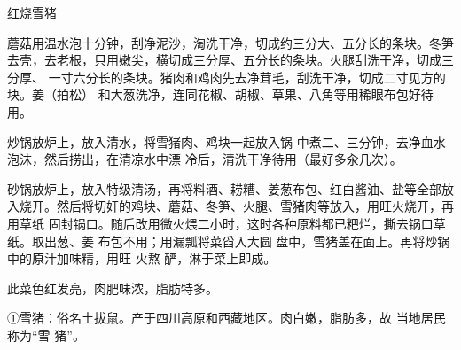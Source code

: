 \begin{recipe}{红烧雪猪}

\ingredients


\cooking

\step 蘑菇用温水泡十分钟，刮净泥沙，淘洗干净，切成约三分大、五分长的条块。冬笋
去壳，去老根，只用嫩尖，横切成三分厚、五分长的条块。火腿刮洗干净，切成三分厚、
一寸六分长的条块。猪肉和鸡肉先去净茸毛，刮洗干净，切成二寸见方的块。姜（拍松）
和大葱洗净，连同花椒、胡椒、草果、八角等用稀眼布包好待用。

\step 炒锅放炉上，放入清水，将雪猪肉、鸡块一起放入锅 中煮二、三分钟，去净血水
泡沫，然后捞出，在清凉水中漂 冷后，清洗干净待用（最好多汆几次）。

\step 砂锅放炉上，放入特级清汤，再将料酒、耢糟、姜葱布包、红白酱油、盐等全部放
入烧开。然后将切奸的鸡块、蘑菇、冬笋、火腿、雪猪肉等放入，用旺火烧开，再用草纸
固封锅口。随后改用微火煨二小时，这时各种原料都已粑烂，撕去锅口草纸。取出葱、姜
布包不用；用漏瓢将菜舀入大圆 盘中，雪猪盖在面上。再将炒锅中的原汁加味精，用旺
火熬 酽，淋于菜上即成。

\features

此菜色红发亮，肉肥味浓，脂肪特多。

①雪猪：俗名土拔鼠。产于四川高原和西藏地区。肉白嫩，脂肪多，故 当地居民称为“雪
猪”。

\end{recipe}

